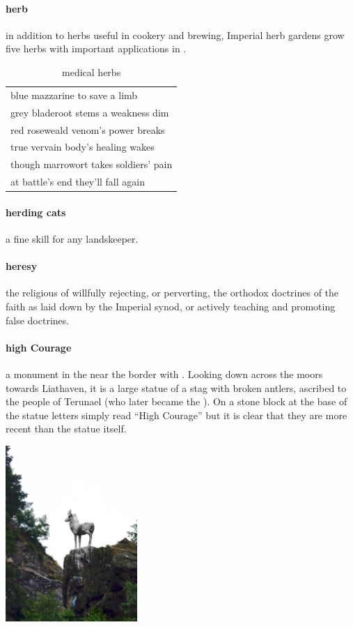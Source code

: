 \paragraph{herb} in addition to herbs useful in cookery and brewing, Imperial herb gardens grow five herbs with important applications in . \begin{table} \begin{tabular}{p{}} blue mazzarine to save a limb\\ grey bladeroot stems a weakness dim\\ red roseweald venom’s power breaks\\ true vervain body's healing wakes\\ though marrowort takes soldiers' pain\\ at battle's end they'll fall again\\ \end{tabular}\caption{medical herbs}\end{table}
\paragraph{herding cats} a fine skill for any landskeeper.
\paragraph{heresy} the religious  of willfully rejecting, or perverting, the orthodox doctrines of the faith as laid down by the Imperial synod, or actively teaching and promoting false doctrines.
\paragraph{high Courage} a monument in the  near the border with . Looking down across the moors towards Liathaven, it is a large statue of a stag with broken antlers, ascribed to the people of Terunael (who later became the ). On a stone block at the base of the statue letters simply read “High Courage” but it is clear that they are more recent than the statue itself. \begin{center}\includegraphics[width=5cm]{encyclopedia/highcourage}\end{center}
